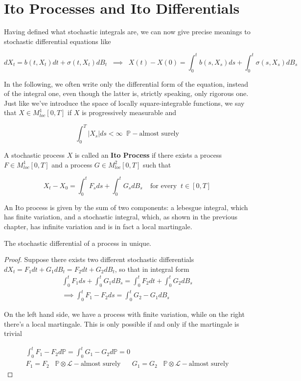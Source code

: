 \section{Ito Processes and Ito Differentials}
Having defined what stochastic integrals are, we can now give precise meanings to stochastic differential equations like

\begin{equation*}
    dX_t = b(t,X_t) dt + \sigma(t,X_t) dB_t \;\; \implies \;\; X(t)-X(0) = \int_0^t b(s,X_s) ds + \int_0^t \sigma(s,X_s) dB_s
\end{equation*}

In the following, we often write only the differential form of the equation, instead of the integral one, even though the latter is, strictly speaking, only rigorous one. Just like we've introduce the space of locally square-integrable functions, we say that $X \in M^1_{loc}[0,T]$ if $X$ is progressively measurable and 

\begin{equation*}
    \int_0^T \vert X_s \vert ds < \infty \;\; \mathbb{P}-\text{almost surely}
\end{equation*}

A stochastic process $X$ is called an \textbf{Ito Process} if there exists a process $F \in M^1_{loc}[0,T]$ and a process $G \in M^2_{loc}[0,T]$ such that

\begin{equation}
    X_t - X_0 = \int_0^t F_s ds + \int_0^t G_s dB_s \;\;\;\; \text{for every} \;\; t \in [0,T]
\end{equation}

An Ito process is given by the sum of two components: a lebesgue integral, which has finite variation, and a stochastic integral, which, as shown in the previous chapter, has infinite variation and is in fact a local martingale. 

\begin{proposition}
    The stochastic differential of a process in unique. 
\end{proposition}
\begin{proof}
    Suppose there exists two different stochastic differentials $dX_t = F_1 dt + G_1 dB_t = F_2 dt + G_2 dB_t$, so that in integral form
    \begin{gather*}
        \int_0^t F_1 ds + \int_0^t G_1 dB_s = \int_0^t F_2 dt + \int_0^t G_2 dB_s \\
        \implies \int_0^t F_1-F_2 ds = \int_0^t G_2 - G_1 dB_s
    \end{gather*}

    On the left hand side, we have a process with finite variation, while on the right there's a local martingale. This is only possible if and only if the martingale is trivial

    \begin{gather*}
        \int_0^t F_1 - F_2 d\mathbb{P} = \int_0^t G_1 - G_2 d\mathbb{P} = 0 \\
        F_1 = F_2 \;\;\; \mathbb{P} \otimes \mathcal{L}-\text{almost surely} \;\;\;\;\;\;  G_1 = G_2 \;\;\; \mathbb{P} \otimes \mathcal{L}-\text{almost surely}
    \end{gather*}
\end{proof}

